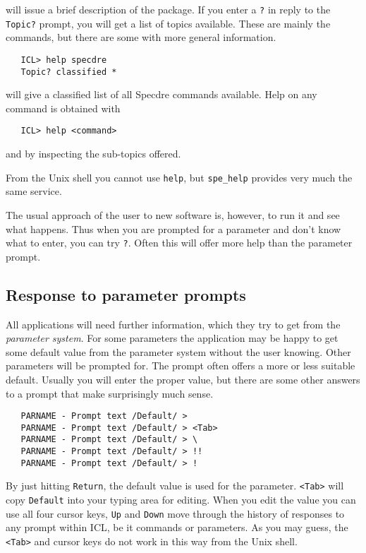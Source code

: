   will issue a brief description of the package. If you enter a {\tt ?}
   in reply to the {\tt Topic?} prompt, you will get a list of topics
   available. These are mainly the commands, but there are some with
   more general information.

\begin{verbatim}
   ICL> help specdre
   Topic? classified *
\end{verbatim}

   will give a classified list of all Specdre commands available. Help
   on any command is obtained with

\begin{verbatim}
   ICL> help <command>
\end{verbatim}

   and by inspecting the sub-topics offered.

   From the Unix shell you cannot use {\tt help}, but {\tt spe\_help}
   provides very much the same service.

   The usual approach of the user to new software is, however, to run it
   and see what happens. Thus when you are prompted for a parameter and
   don't know what to enter, you can try {\tt ?}. Often this will offer
   more help than the parameter prompt.


\subsection{Response to parameter prompts}

   All applications will need further information, which they try to get
   from the {\it parameter system}. For some parameters the application
   may be happy to get some default value from the parameter system
   without the user knowing. Other parameters will be prompted for. The
   prompt often offers a more or less suitable default. Usually you will
   enter the proper value, but there are some other answers to a prompt
   that make surprisingly much sense.

\begin{verbatim}
   PARNAME - Prompt text /Default/ >
   PARNAME - Prompt text /Default/ > <Tab>
   PARNAME - Prompt text /Default/ > \
   PARNAME - Prompt text /Default/ > !!
   PARNAME - Prompt text /Default/ > !
\end{verbatim}

   By just hitting {\tt Return}, the default value is used for the
   parameter. {\tt <Tab>} will copy {\tt Default} into your typing area
   for editing. When you edit the value you can use all four cursor
   keys, {\tt Up} and {\tt Down} move through the history of responses
   to any prompt within ICL, be it commands or parameters. As you may
   guess, the {\tt <Tab>} and cursor keys do not work in this way from
   the Unix shell.

